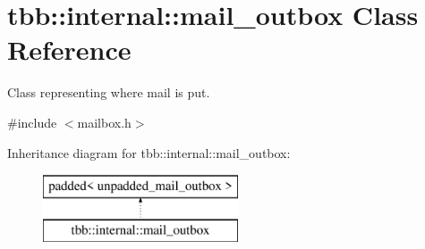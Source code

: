 \hypertarget{classtbb_1_1internal_1_1mail__outbox}{}\section{tbb\+:\+:internal\+:\+:mail\+\_\+outbox Class Reference}
\label{classtbb_1_1internal_1_1mail__outbox}


Class representing where mail is put.  




{\ttfamily \#include $<$mailbox.\+h$>$}

Inheritance diagram for tbb\+:\+:internal\+:\+:mail\+\_\+outbox\+:\begin{figure}[H]
\begin{center}
\leavevmode
\includegraphics[height=2.000000cm]{classtbb_1_1internal_1_1mail__outbox}
\end{center}
\end{figure}
